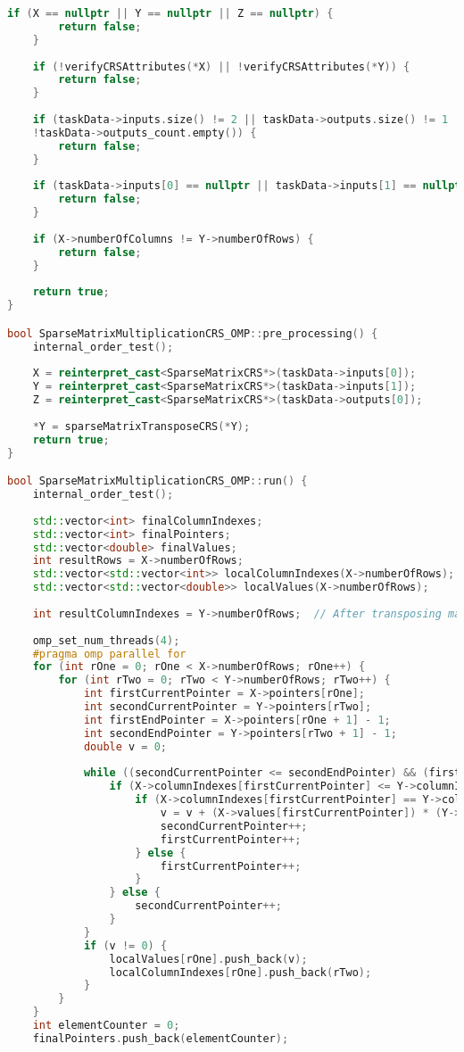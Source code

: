 \documentclass[a4paper, 14pt]{article}
\theoremstyle{plain}
\begin{document}
\begin{lstlisting}[language=C++,caption=Файл sparse\_matmult\_crs\_omp.cpp]
	if (X == nullptr || Y == nullptr || Z == nullptr) {
		return false;
	}
	
	if (!verifyCRSAttributes(*X) || !verifyCRSAttributes(*Y)) {
		return false;
	}
	
	if (taskData->inputs.size() != 2 || taskData->outputs.size() != 1 || !taskData->inputs_count.empty() ||
	!taskData->outputs_count.empty()) {
		return false;
	}
	
	if (taskData->inputs[0] == nullptr || taskData->inputs[1] == nullptr || taskData->outputs[0] == nullptr) {
		return false;
	}
	
	if (X->numberOfColumns != Y->numberOfRows) {
		return false;
	}
	
	return true;
}

bool SparseMatrixMultiplicationCRS_OMP::pre_processing() {
	internal_order_test();
	
	X = reinterpret_cast<SparseMatrixCRS*>(taskData->inputs[0]);
	Y = reinterpret_cast<SparseMatrixCRS*>(taskData->inputs[1]);
	Z = reinterpret_cast<SparseMatrixCRS*>(taskData->outputs[0]);
	
	*Y = sparseMatrixTransposeCRS(*Y);
	return true;
}

bool SparseMatrixMultiplicationCRS_OMP::run() {
	internal_order_test();
	
	std::vector<int> finalColumnIndexes;
	std::vector<int> finalPointers;
	std::vector<double> finalValues;
	int resultRows = X->numberOfRows;
	std::vector<std::vector<int>> localColumnIndexes(X->numberOfRows);
	std::vector<std::vector<double>> localValues(X->numberOfRows);
	
	int resultColumnIndexes = Y->numberOfRows;  // After transposing matrix Y
	
	omp_set_num_threads(4);
	#pragma omp parallel for
	for (int rOne = 0; rOne < X->numberOfRows; rOne++) {
		for (int rTwo = 0; rTwo < Y->numberOfRows; rTwo++) {
			int firstCurrentPointer = X->pointers[rOne];
			int secondCurrentPointer = Y->pointers[rTwo];
			int firstEndPointer = X->pointers[rOne + 1] - 1;
			int secondEndPointer = Y->pointers[rTwo + 1] - 1;
			double v = 0;
			
			while ((secondCurrentPointer <= secondEndPointer) && (firstCurrentPointer <= firstEndPointer)) {
				if (X->columnIndexes[firstCurrentPointer] <= Y->columnIndexes[secondCurrentPointer]) {
					if (X->columnIndexes[firstCurrentPointer] == Y->columnIndexes[secondCurrentPointer]) {
						v = v + (X->values[firstCurrentPointer]) * (Y->values[secondCurrentPointer]);
						secondCurrentPointer++;
						firstCurrentPointer++;
					} else {
						firstCurrentPointer++;
					}
				} else {
					secondCurrentPointer++;
				}
			}
			if (v != 0) {
				localValues[rOne].push_back(v);
				localColumnIndexes[rOne].push_back(rTwo);
			}
		}
	}
	int elementCounter = 0;
	finalPointers.push_back(elementCounter);
	

\end{lstlisting}
\end{document}
